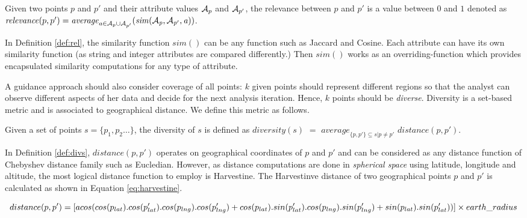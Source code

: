 \begin{definition}[Relevance]
Given two points $p$ and $p'$ and their attribute values ${\cal A}_{p}$ and ${\cal A}_{p'}$, the relevance between $p$ and $p'$ is a value between $0$ and $1$ denoted as $\mathit{relevance}(p,p') = \mathit{average}_{a \in {\cal A}_{p} \cup {\cal A}_{p'}}(\mathit{sim({\cal A}_{p}, {\cal A}_{p'}, a)})$.
\label{def:rel}
\end{definition}

In Definition \ref{def:rel}, the similarity function $\mathit{sim}()$ can be any function such as Jaccard and Cosine. Each attribute can have its own similarity function (as string and integer attributes are compared differently.) Then $\mathit{sim}()$ works as an overriding-function which provides encapsulated similarity computations for any type of attribute.

\vspace{5pt}
 A guidance approach should also consider coverage of all points: $k$ given points should represent different regions so that the analyst can observe different aspects of her data and decide for the next analysis iteration. Hence, $k$ points should be {\em diverse}. Diversity is a set-based metric and is associated to geographical distance. We define this metric as follows.

\begin{definition}
Given a set of points $s = \{ p_1, p_2 \dots \}$, the diversity of $s$ is defined as $\mathit{diversity}(s)$ $=$ $\mathit{average}_{\{p, p'\} \subseteq s | p \neq p' }$ $\mathit{distance}(p,p')$.
\label{def:divs}
\end{definition}

In Definition \ref{def:divs}, $\mathit{distance}(p,p')$ operates on geographical coordinates of $p$ and $p'$ and can be considered as any distance function of Chebyshev distance family such as Eucledian. However, as distance computations are done in {\em spherical space} using latitude, longitude and altitude, the most logical distance function to employ is Harvestine. The Harvestinve distance of two geographical points $p$ and $p'$ is calculated as shown in Equation \ref{eq:harvestine}.

\begin{dmath}
\label{eq:harvestine}
distance(p,p') = [ acos(cos(p_{lat}) . cos(p'_{lat}) . cos(p_{lng}) . cos(p'_{lng})\\ + cos(p_{lat}) . sin(p'_{lat}). cos(p_{lng}) . sin(p'_{lng}) + sin(p_{lat}) . sin(p'_{lat})) ] \times earth\_radius
\end{dmath}


